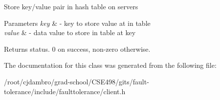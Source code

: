 Store key/value pair in hash table on servers


\begin{DoxyParams}{Parameters}
{\em key} & -\/ key to store value at in table \\
\hline
{\em value} & -\/ data value to store in table at key\\
\hline
\end{DoxyParams}
\begin{DoxyReturn}{Returns}
status. 0 on success, non-\/zero otherwise. 
\end{DoxyReturn}


The documentation for this class was generated from the following file\+:\begin{DoxyCompactItemize}
\item 
/root/cjdambro/grad-\/school/\+C\+S\+E498/gits/fault-\/tolerance/include/faulttolerance/client.\+h\end{DoxyCompactItemize}
